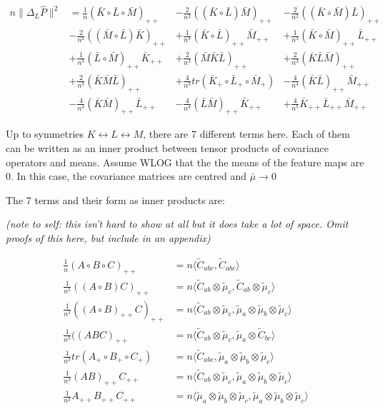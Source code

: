 \documentclass{article}
\begin{document}
\begin{align*}
n\|\Delta_L \hat{P}\|^2 &= \frac{1}{n}(\bar{K} \circ \bar{L}\circ \bar{M})_{++} &-
\frac{2}{n^2}((\bar{K}\circ \bar{L}) \bar{M})_{++} & - 
\frac{2}{n^2}((\bar{K} \circ \bar{M}) \bar{L})_{++} \\&- 
\frac{2}{n^2}((\bar{M} \circ \bar{L}) \bar{K})_{++} &+ 
\frac{1}{n^3}(\bar{K} \circ \bar{L})_{++} \bar{M}_{++} &+ 
\frac{1}{n^3}(\bar{K} \circ \bar{M})_{++} \bar{L}_{++} \\&+ 
\frac{1}{n^3}(\bar{L} \circ \bar{M})_{++} \bar{K}_{++} &+ 
\frac{2}{n^3}(\bar{M}\bar{K}\bar{L})_{++} &+ 
\frac{2}{n^3}(\bar{K}\bar{L}\bar{M})_{++} \\&+ 
\frac{2}{n^3}(\bar{K}\bar{M}\bar{L})_{++} &+ 
\frac{4}{n^3}tr(\bar{K}_+ \circ \bar{L}_+ \circ \bar{M}_+) &-
\frac{4}{n^4}(\bar{K} \bar{L})_{++} \bar{M}_{++} \\& - 
\frac{4}{n^4}(\bar{K}\bar{M})_{++}\bar{L}_{++} &- 
\frac{4}{n^4}(\bar{L}\bar{M})_{++} \bar{K}_{++} &+
\frac{4}{n^5}\bar{K}_{++} \bar{L}_{++} \bar{M}_{++}
\end{align*}

Up to symmetries $K\leftrightarrow L \leftrightarrow M$, there are 7 different terms here. Each of them can be written as an inner product between tensor products of covariance operators and means. Assume WLOG that the the means of the feature maps are 0. In this case, the covariance matrices are centred and $\bar{\mu} \longrightarrow 0$

The 7 terms and their form as inner products are:

\emph{(note to self: this isn't hard to show at all but it does take a lot of space. Omit proofs of this here, but include in an appendix)}

\begin{align*}
\frac{1}{n}(A\circ B \circ C)_{++} &= n\langle \tilde{C}_{abc},\tilde{C}_{abc} \rangle \\
\frac{1}{n^2}((A\circ B)C)_{++} &= n\langle \tilde{C}_{ab}\otimes \tilde{\mu}_c,\tilde{C}_{ab}\otimes \tilde{\mu}_c \rangle \\
\frac{1}{n^3}((A\circ B)_{++}C)_{++} &= n\langle \tilde{C}_{ab}\otimes \tilde{\mu}_c,\tilde{\mu}_a \otimes \tilde{\mu}_b \otimes \tilde{\mu}_c \rangle \\
\frac{1}{n^3}((ABC)_{++} &= n\langle \tilde{C}_{ab}\otimes \tilde{\mu}_c,\tilde{\mu}_a \otimes \tilde{C}_{bc} \rangle \\
\frac{1}{n^3}tr(A_+\circ B_+ \circ C_+) &= n\langle \tilde{C}_{abc} ,\tilde{\mu}_a \otimes \tilde{\mu}_b \otimes \tilde{\mu}_c \rangle \\
\frac{1}{n^3}(AB)_{++}C_{++} &= n\langle \tilde{C}_{ab}\otimes \tilde{\mu}_c,\tilde{\mu}_a \otimes \tilde{\mu}_b \otimes \tilde{\mu}_c \rangle \\
\frac{1}{n^3}A_{++}B_{++}C_{++} &= n\langle \tilde{\mu}_a \otimes \tilde{\mu}_b \otimes \tilde{\mu}_c,\tilde{\mu}_a \otimes \tilde{\mu}_b \otimes \tilde{\mu}_c \rangle \\
\end{align*}
\end{document}
